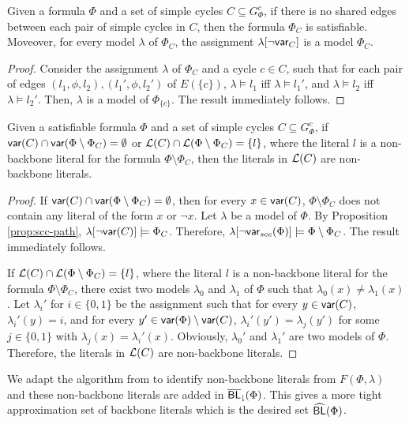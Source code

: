 \begin{proposition}\label{prop:scc-path}
Given a formula $\Phi$ and a set of simple cycles $C\subseteq G_\Phi^{c}$,
if there is no shared edges between each pair of simple cycles in $C$,
then the formula $\Phi_{C}$ is satisfiable. Moveover, for every model $\lambda$ of $\Phi_{C}$,
the assignment $\lambda[\neg \textsf{var}_{C}]$ is a model $\Phi_C$.
\end{proposition}

\begin{proof}
Consider the assignment $\lambda$ of $\Phi_{C}$ and a cycle $c\in C$, such that for each pair of edges $(l_1,\phi,l_2),(l_1',\phi,l_2')$ of $E(\{c\})$,
$\lambda\models l_1$ iff $\lambda\models l_1'$, and $\lambda\models l_2$ iff $\lambda\models l_2'$.
Then, $\lambda$ is a model of $\Phi_{\{c\}}$. The result immediately follows.
\end{proof}

\begin{lemma}
Given a satisfiable formula $\Phi$ and a set of simple cycles $C\subseteq G_\Phi^{c}$, if $\textsf{var}(C)\cap \textsf{var}(\Phi\setminus\Phi_{C})=\emptyset$ or ${\cal L}(C)\cap {\cal L}(\Phi\setminus\Phi_C)=\{l\}$, where the literal $l$ is a non-backbone literal for the formula $\Phi\setminus\Phi_C$, then the literals in ${\cal L}(C)$ are non-backbone literals.
\end{lemma}

\begin{proof}
If $\textsf{var}(C)\cap \textsf{var}(\Phi\setminus\Phi_{C})=\emptyset$, then for every $x\in\textsf{var}(C)$, $\Phi\setminus\Phi_C$ does not contain any
literal of the form $x$ or $\neg x$. Let $\lambda$ be a model of $\Phi$.
By Proposition \ref{prop:scc-path}, $\lambda[\neg\textsf{var}(C)]\models\Phi_C$.
Therefore, $\lambda[\neg\textsf{var}_{scc}(\Phi) ]\models\Phi\setminus\Phi_C$.
The result immediately follows.

If ${\cal L}(C)\cap {\cal L}(\Phi\setminus\Phi_C)=\{l\}$, where the literal $l$ is a non-backbone literal for the formula $\Phi\setminus\Phi_C$,
there exist two models $\lambda_0$ and $\lambda_1$ of $\Phi$ such that $\lambda_0(x)\neq \lambda_1(x)$.
Let $\lambda_i'$ for $i\in\{0,1\}$ be the assignment such that
for every $y\in\textsf{var}(C)$, $\lambda_i'(y)=i$, and for every $y'\in \textsf{var}(\Phi)\setminus\textsf{var}(C)$,
$\lambda_i'(y')=\lambda_j(y')$ for some $j\in\{0,1\}$ with $\lambda_j(x)=\lambda_i'(x)$.
Obviously, $\lambda_0'$ and $\lambda_1'$ are two models of $\Phi$. Therefore,
the literals in ${\cal L}(C)$ are non-backbone literals.
\end{proof}

We adapt the algorithm from \cite{Jon75} to identify non-backbone literals from $F(\Phi,\lambda)$ and these non-backbone literals are added in ${\sf \overline{BL}_\downharpoonright}(\Phi)$.
This gives a more tight approximation set of backbone literals which is the desired set ${\sf \widehat{BL}}(\Phi)$.
